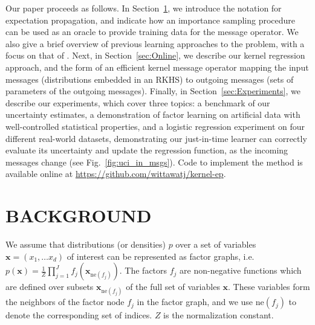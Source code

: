 \documentclass[english]{article}
\theoremstyle{plain}
\theoremstyle{plain}
\newcommand{\bx}{\mathbf{x}}				%
\newcommand{\factor}{f}				%
\newcommand{\fis}[1]{\mathrm{ne}(#1)}   	%
\newcommand{\fx}[1]{ \mathbf{x}_{\mathrm{ne}(#1)} }   	%
\newcommand{\figref}[1]{Fig.~\ref{#1}}
\newcommand{\secref}[1]{Section~\ref{#1}}
\begin{document}

Our paper proceeds as follows. In \secref{sec:EP}, we introduce the notation for expectation propagation,
and indicate how an importance sampling procedure can be used as an oracle to provide training data for the message operator.
We also give a brief overview of previous learning approaches to the problem, with a focus on
that of \citet{Eslami2014}.
Next, in \secref{sec:Online}, we describe our kernel regression approach, and
the form of an efficient kernel message operator mapping the input messages (distributions embedded in an
RKHS) to outgoing messages (sets of parameters of the outgoing messages).
Finally, in \secref{sec:Experiments}, we describe our experiments, which cover three topics:
a benchmark of our uncertainty estimates, a demonstration of factor learning
on artificial data with well-controlled statistical properties,
and a logistic regression experiment on four different real-world datasets,
demonstrating our just-in-time learner can correctly evaluate its uncertainty
and update the regression function, as the incoming messages change (see \figref{fig:uci_in_msgs}).
Code to implement the method is available online at \url{https://github.com/wittawatj/kernel-ep}.




\section{BACKGROUND}
\label{sec:EP}

We assume that distributions (or densities) $p$ over a set of variables 
$\bx = (x_1, \dots x_d)$ of interest can be represented as factor graphs, i.e.\
%
$p(\bx) = \frac{1}{Z} \prod_{j=1}^J \factor_j(\fx{\factor_j})$.
The factors $\factor_j$ are non-negative functions which are defined over subsets $\fx{\factor_j}$ of the full set of variables $\bx$. These variables form the neighbors of the factor node $\factor_j$ in the factor graph, and we use $\fis{\factor_j}$ to denote the corresponding set of indices. $Z$ is the normalization constant.
\end{document}
